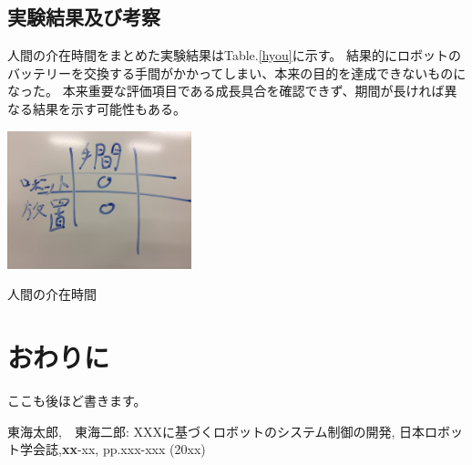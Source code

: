 \documentclass[10pt]{jsarticle}
\begin{document}
\subsection{実験結果及び考察}
人間の介在時間をまとめた実験結果はTable.\ref{hyou}に示す。
結果的にロボットのバッテリーを交換する手間がかかってしまい、本来の目的を達成できないものになった。
本来重要な評価項目である成長具合を確認できず、期間が長ければ異なる結果を示す可能性もある。
\begin{table}[ht]
    \centering
    \includegraphics[width=0.4\textwidth]{img/IMG_3897.JPG}
    \caption{人間の介在時間}
    \label{hyou}
\end{table}
\section{おわりに}
ここも後ほど書きます。

\begin{thebibliography}{10}

東海太郎,　東海二郎: XXXに基づくロボットのシステム制御の開発,
日本ロボット学会誌,{\bf xx}-xx, pp.xxx-xxx (20xx)

\end{thebibliography}
\end{document}
